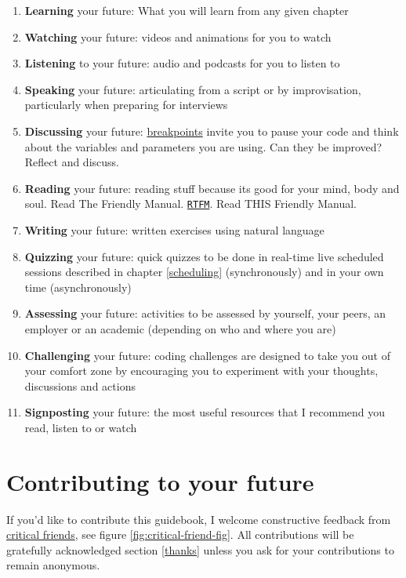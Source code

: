 \documentclass[
]{book}
\providecommand{\tightlist}{%
  \setlength{\itemsep}{0pt}\setlength{\parskip}{0pt}}
\begin{document}
\begin{enumerate}
\def\labelenumi{\arabic{enumi}.}
\tightlist
\item
  \textbf{Learning} your future: What you will learn from any given chapter
\item
  \textbf{Watching} your future: videos and animations for you to watch
\item
  \textbf{Listening} to your future: audio and podcasts for you to listen to
\item
  \textbf{Speaking} your future: articulating from a script or by improvisation, particularly when preparing for interviews
\item
  \textbf{Discussing} your future: \href{https://en.wikipedia.org/wiki/Breakpoint}{breakpoints} invite you to pause your code and think about the variables and parameters you are using. Can they be improved? Reflect and discuss.
\item
  \textbf{Reading} your future: reading stuff because its good for your mind, body and soul. Read The Friendly Manual. \href{https://en.wikipedia.org/wiki/RTFM}{\texttt{RTFM}}. Read THIS Friendly Manual.
\item
  \textbf{Writing} your future: written exercises using natural language
\item
  \textbf{Quizzing} your future: quick quizzes to be done in real-time live scheduled sessions described in chapter \ref{scheduling} (synchronously) and in your own time (asynchronously)
\item
  \textbf{Assessing} your future: activities to be assessed by yourself, your peers, an employer or an academic (depending on who and where you are)
\item
  \textbf{Challenging} your future: coding challenges are designed to take you out of your comfort zone by encouraging you to experiment with your thoughts, discussions and actions
\item
  \textbf{Signposting} your future: the most useful resources that I recommend you read, listen to or watch
\end{enumerate}

\hypertarget{contributing}{%
\section{Contributing to your future}\label{contributing}}

If you'd like to contribute this guidebook, I welcome constructive feedback from \href{https://en.wikipedia.org/wiki/Critical_friend}{critical friends}, see figure \ref{fig:critical-friend-fig}. All contributions will be gratefully acknowledged section \ref{thanks} unless you ask for your contributions to remain anonymous.
\end{document}
